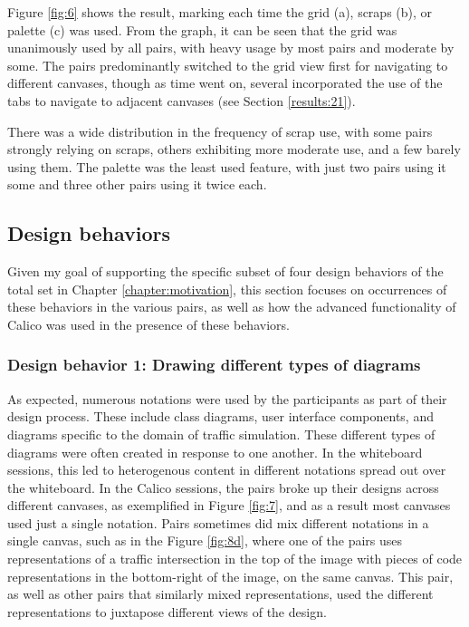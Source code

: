 \documentclass[12pt,fleqn]{ucithesis}
\begin{document}
Figure \ref{fig:6} shows the result, marking each time the grid (a), scraps (b), or palette (c) was used. From the graph, it can be seen that the grid was unanimously used by all pairs, with heavy usage by most pairs and moderate by some. The pairs predominantly switched to the grid view first for navigating to different canvases, though as time went on, several incorporated the use of the tabs to navigate to adjacent canvases (see Section \ref{results:21}). 

There was a wide distribution in the frequency of scrap use, with some pairs strongly relying on scraps, others exhibiting more moderate use, and a few barely using them. The palette was the least used feature, with just two pairs using it some and three other pairs using it twice each.

\subsection{Design behaviors}
\label{results:2}

Given my goal of supporting the specific subset of four design behaviors of the total set in Chapter \ref{chapter:motivation}, this section focuses on occurrences of these behaviors in the various pairs, as well as how the advanced functionality of Calico was used in the presence of these behaviors.

\subsubsection{Design behavior 1: Drawing different types of diagrams}
\label{results:23}

As expected, numerous notations were used by the participants as part of their design process. These include class diagrams, user interface components, and diagrams specific to the domain of traffic simulation. These different types of diagrams were often created in response to one another. In the whiteboard sessions, this led to heterogenous content in different notations spread out over the whiteboard. In the Calico sessions, the pairs broke up their designs across different canvases, as exemplified in Figure \ref{fig:7}, and as a result most canvases used just a single notation. Pairs sometimes did mix different notations in a single canvas, such as in the Figure \ref{fig:8d}, where one of the pairs uses representations of a traffic intersection in the top of the image with pieces of code representations in the bottom-right of the image, on the same canvas. This pair, as well as other pairs that similarly mixed representations, used the different representations to juxtapose different views of the design.
\end{document}
